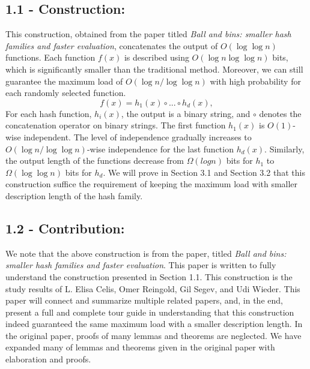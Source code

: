 \documentclass[a4paper, english]{paper}
\begin{document}
	\subsection{1.1 - Construction:}
\quad This construction, obtained from the paper  titled \textit{Ball and bins: smaller hash families and faster evaluation}, concatenates the output of  $O(\log \log n)$ functions. Each function $f(x)$ is described using $O(\log n \log\log n)$ bits, which is significantly smaller than the traditional method. Moreover, we can still guarantee the maximum load of $O(\log n/ \log \log n)$ with high probability for each randomly selected function.
			$$f(x) = h_1(x) \circ ... \circ h_d(x),$$
\quad For each hash function, $h_i(x)$, the output is a binary string, and $\circ$ denotes the concatenation operator on binary strings. The first function $h_1(x)$ is $O(1)$-wise independent. The level of independence gradually increases to $O(\log n/ \log \log n)$-wise independence for the last function $h_d(x)$. Similarly, the output length of the functions decrease from $\Omega(logn)$ bits for $h_1$ to $\Omega(\log\log n)$ bits for $h_d$. We will prove in Section 3.1 and Section 3.2 that this construction suffice the requirement of keeping the maximum load with smaller description length of the hash family. \\
	
	\subsection{1.2 - Contribution:} 
\quad We note that the above construction is from the paper, titled \textit{Ball and bins: smaller hash families and faster evaluation}. This paper is written to fully understand the construction presented in Section 1.1. This construction is the study results of L. Elisa Celis, Omer Reingold, Gil Segev, and Udi Wieder. This paper will connect and summarize multiple related papers, and, in the end, present a full and complete tour guide in understanding that this construction indeed guaranteed the same maximum load with a smaller description length. In the original paper, proofs of many lemmas and theorems are neglected. We have expanded many of lemmas and theorems given in the original paper with elaboration and proofs. \\
		
\end{document}
